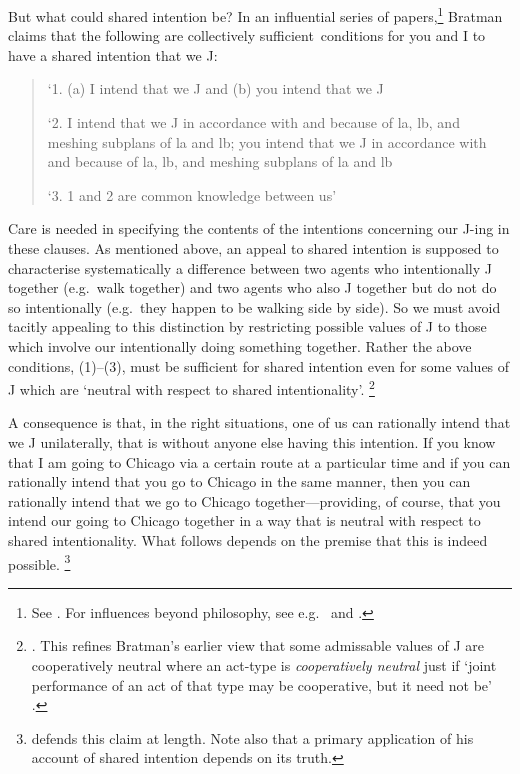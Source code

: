 \documentclass[12pt,\papersize]{extarticle}
\begin{document}
But what could shared intention be?
In an influential series of papers,\footnote{ 
See \citet{Bratman:1992mi,Bratman:1993je,Bratman:1999fr,Bratman:2009lv}.
For influences beyond philosophy, see e.g.\ \citet{Tomasello:2005wx} and \citet{Knoblich:2008hy}. 
}
Bratman claims that the following are collectively sufficient\footnotemark \ conditions for you and I to have a shared intention that we J:
%
%
\begin{quote}
\label{quote:bratman_account}
`1. (a) I intend that we J and (b) you intend that we J
 
`2. I intend that we J in accordance with and because of la, lb, and meshing subplans of la and lb; you intend that we J in accordance with and because of la, lb, and meshing subplans of la and lb
 
`3. 1 and 2 are common knowledge between us' \citep[][p.\ View 4]{Bratman:1993je}
\end{quote}
%
Care is needed in specifying the contents of the intentions concerning our J-ing in these clauses. 
As mentioned above, an appeal to shared intention is supposed to  characterise systematically a difference between two agents who intentionally J together (e.g.\ walk  together) and two agents who also  J together but do not do so intentionally (e.g.\ they happen to be walking side by side). 
So we must avoid tacitly appealing to this distinction by  restricting possible values of J to those which involve our intentionally doing something together. 
Rather the above  conditions, (1)--(3), must be sufficient for shared intention even for some values of J which are `neutral with respect to shared intentionality'.%
\footnote{
 \citet[p.\ 147]{Bratman:1999fr}.
 This refines Bratman's earlier view that some admissable values of J are cooperatively neutral 
 	where an  act-type is \emph{cooperatively neutral} just if `joint performance of an act of that type may be cooperative, but it need not be' \citep[p.\ 330]{Bratman:1992mi}. 
}

A consequence is that, in the right situations, one of us can rationally intend that we J unilaterally, that is without anyone else having this intention. 
If you know that I am going to Chicago via a certain route at a particular time
and if you can rationally intend that you go to Chicago in the same manner,
then you can rationally intend that we go to Chicago together---providing, of course, that you intend our going to Chicago together in a way that is neutral with respect to shared intentionality.
What follows depends on the premise that this is indeed possible.%
\footnote{ 
\citet{Bratman:1999fr}  defends this claim at length. 
Note also that a primary application of his account of shared intention depends on its truth.
}
\end{document}
